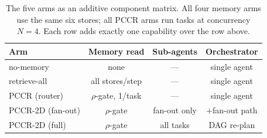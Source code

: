 \documentclass[10pt,twocolumn]{article}
\begin{document}
\begin{table}[t]
\centering\footnotesize
\setlength{\tabcolsep}{3.2pt}
\begin{tabular}{@{}lccc@{}}
\toprule
Arm & Memory read & Sub-agents & Orchestrator \\
\midrule
no-memory        & none              & ---          & single agent \\
retrieve-all     & all stores/step   & ---          & single agent \\
PCCR (router)    & $\rho$-gate, 1/task & ---        & single agent \\
PCCR-2D (fan-out)& $\rho$-gate       & fan-out only & $+$fan-out path \\
PCCR-2D (full)   & $\rho$-gate       & all tasks    & DAG re-plan \\
\bottomrule
\end{tabular}
\caption{The five arms as an additive component matrix. All four memory arms use the same six stores;
all PCCR arms run tasks at concurrency $N{=}4$. Each row adds exactly one capability over the row above.}
\label{tab:arms}
\end{table}
\end{document}
